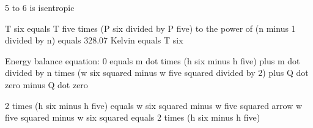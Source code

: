 5 to 6 is isentropic

T six equals T five times (P six divided by P five) to the power of (n minus 1 divided by n) equals 328.07 Kelvin equals T six

Energy balance equation:
0 equals m dot times (h six minus h five) plus m dot divided by n times (w six squared minus w five squared divided by 2) plus Q dot zero minus Q dot zero

2 times (h six minus h five) equals w six squared minus w five squared arrow w five squared minus w six squared equals 2 times (h six minus h five)